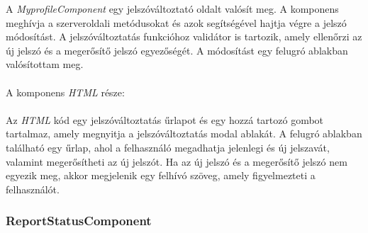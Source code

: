 A \textit{MyprofileComponent} egy jelszóváltoztató oldalt valósít meg. A komponens meghívja a szerveroldali metódusokat és azok segítségével hajtja végre a jelszó módosítást. A jelszóváltoztatás funkcióhoz validátor is tartozik, amely ellenőrzi az új jelszó és a megerősítő jelszó egyezőségét. A módosítást egy felugró ablakban valósítottam meg.\\
\\
A komponens \textit{HTML} része:\\
\\
Az \textit{HTML} kód egy jelszóváltoztatás űrlapot és egy hozzá tartozó gombot tartalmaz, amely megnyitja a jelszóváltoztatás modal ablakát. A felugró ablakban található egy űrlap, ahol a felhasználó megadhatja jelenlegi és új jelszavát, valamint megerősítheti az új jelszót. Ha az új jelszó és a megerősítő jelszó nem egyezik meg, akkor megjelenik egy felhívó szöveg, amely figyelmezteti a felhasználót.


\subsubsection{ReportStatusComponent}

